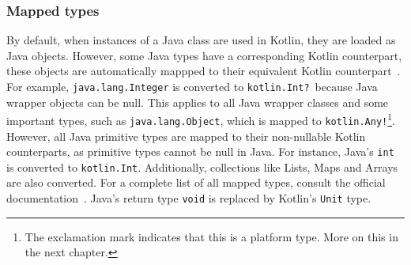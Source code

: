 \documentclass[a4paper,11pt]{article}
\begin{document}
\subsubsection{Mapped types}
By default, when instances of a Java class are used in Kotlin, they are loaded as Java objects. However, some Java types have a corresponding Kotlin counterpart, these objects are automatically mappped to their equivalent Kotlin counterpart~\cite{interop-mapped-types}. For example, \texttt{java.lang.Integer} is converted to \texttt{kotlin.Int?}~because Java wrapper objects can be null. This applies to all Java wrapper classes and some important types, such as \texttt{java.lang.Object}, which is mapped to \texttt{kotlin.Any!}\footnote{The exclamation mark indicates that this is a platform type. More on this in the next chapter.}. However, all Java primitive types are mapped to their non-nullable Kotlin counterparts, as primitive types cannot be null in Java. For instance, Java's \texttt{int} is converted to \texttt{kotlin.Int}. Additionally, collections like Lists, Maps and Arrays are also converted. For a complete list of all mapped types, consult the official documentation~\cite{interop-mapped-types}. Java's return type \texttt{void} is replaced by Kotlin's \texttt{Unit} type.
\end{document}
